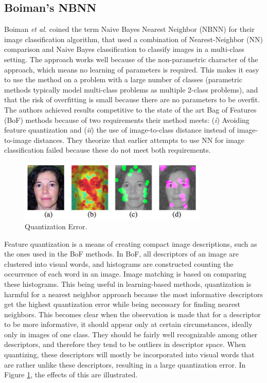 \subsection{Boiman's NBNN} %
\label{sub:boiman_s_nbnn}
Boiman \emph{et al.} \cite{boiman2008defense} coined the term Naive Bayes Nearest Neighbor (NBNN) for their image classification algorithm, that used a combination of Nearest-Neighbor (NN) comparison and Naive Bayes classification to classify images in a multi-class setting. The approach works well because of the non-parametric character of the approach, which means no learning of parameters is required. This makes it easy to use the method on a problem with a large number of classes (parametric methods typically model multi-class problems as multiple 2-class problems), and that the risk of overfitting is small because there are no parameters to be overfit. The authors achieved results competitive to the state of the art Bag of Features (BoF) methods because of two requirements their method meets: (\emph{i}) Avoiding feature quantization and (\emph{ii}) the use of image-to-class distance instead of image-to-image distances. They theorize that earlier attempts to use NN  for image classification failed because these do not meet both requirements.

\begin{figure}[hbt]
    \centering
    \includegraphics[width=0.8\textwidth]{QuantizationError}
    \caption{Quantization Error.}
    \label{fig:quantization_error}
\end{figure}

Feature quantization is a means of creating compact image descriptions, such as the ones used in the BoF methods. In BoF, all descriptors of an image are clustered into visual words, and histograms are constructed counting the occurrence of each word in an image. Image matching is based on comparing these histograms. This being useful in learning-based methods, quantization is harmful for a nearest neighbor approach because the most informative descriptors get the highest quantization error while being necessary for finding nearest neighbors. This becomes clear when the observation is made that for a descriptor to be more informative, it should appear only at certain circumstances, ideally only in images of one class. They should be fairly well recognizable among other descriptors, and therefore they tend to be outliers in descriptor space. When quantizing, these descriptors will mostly be incorporated into visual words that are rather unlike these descriptors, resulting in a large quantization error. In Figure \ref{fig:quantization_error}, the effects of this are illustrated. 

